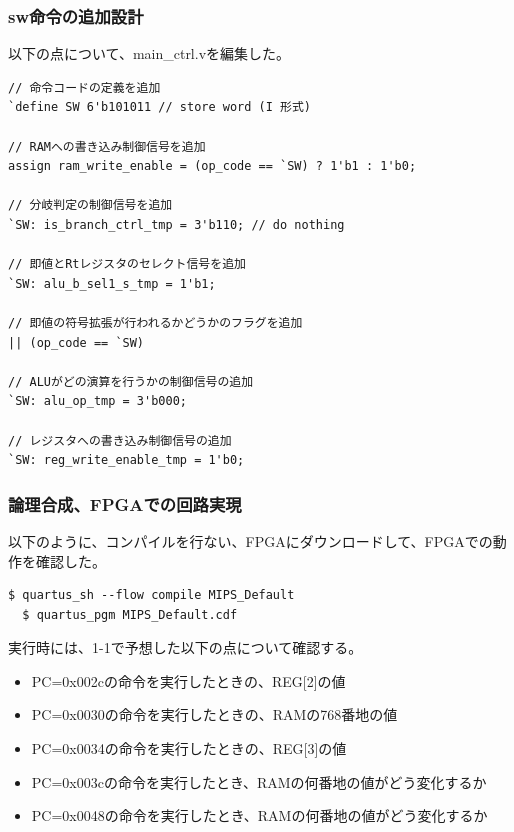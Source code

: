 \subsubsection{sw命令の追加設計}
以下の点について、main\_ctrl.vを編集した。
\begin{lstlisting}[caption={sw命令の追加設計},label={sw命令の追加設計}]
// 命令コードの定義を追加
`define SW 6'b101011 // store word (I 形式)

// RAMへの書き込み制御信号を追加
assign ram_write_enable = (op_code == `SW) ? 1'b1 : 1'b0;

// 分岐判定の制御信号を追加
`SW: is_branch_ctrl_tmp = 3'b110; // do nothing

// 即値とRtレジスタのセレクト信号を追加
`SW: alu_b_sel1_s_tmp = 1'b1;

// 即値の符号拡張が行われるかどうかのフラグを追加
|| (op_code == `SW)

// ALUがどの演算を行うかの制御信号の追加
`SW: alu_op_tmp = 3'b000;

// レジスタへの書き込み制御信号の追加
`SW: reg_write_enable_tmp = 1'b0;

\end{lstlisting}

\subsubsection{論理合成、FPGAでの回路実現}
以下のように、コンパイルを行ない、FPGAにダウンロードして、FPGAでの動作を確認した。

\begin{lstlisting}[caption={コンパイル、ダウンロード},label={コンパイル、ダウンロード1-2}]
  $ quartus_sh --flow compile MIPS_Default
  $ quartus_pgm MIPS_Default.cdf 
\end{lstlisting}

実行時には、1-1で予想した以下の点について確認する。
\begin{itemize}
  \item PC=0x002cの命令を実行したときの、REG[2]の値
  \item PC=0x0030の命令を実行したときの、RAMの768番地の値
  \item PC=0x0034の命令を実行したときの、REG[3]の値
  \item PC=0x003cの命令を実行したとき、RAMの何番地の値がどう変化するか
  \item PC=0x0048の命令を実行したとき、RAMの何番地の値がどう変化するか
\end{itemize}


